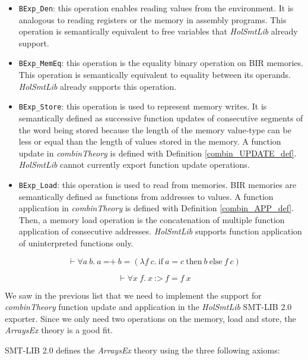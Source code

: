 \documentclass{kththesis}
\begin{document}
{\begin{itemize}
    \item \texttt{BExp\_Den}: this operation enables reading values from the environment. It is analogous to reading registers or the memory in assembly programs. This operation is semantically equivalent to free variables that \textit{HolSmtLib} already support.
    \item \texttt{BExp\_MemEq}: this operation is the equality binary operation on BIR memories. This operation is semantically equivalent to equality between its operands. \textit{HolSmtLib} already supports this operation.
    \item \texttt{BExp\_Store}: this operation is used to represent memory writes. It is semantically defined as successive function updates of consecutive segments of the word being stored because the length of the memory value-type can be less or equal than the length of values stored in the memory. A function update in \textit{combinTheory} is defined with Definition \ref{combin_UPDATE_def}. \textit{HolSmtLib} cannot currently export function update operations.
    \item \texttt{BExp\_Load}: this operation is used to read from memories. BIR memories are semantically defined as functions from addresses to values. A function application in \textit{combinTheory} is defined with Definition \ref{combin_APP_def}. Then, a memory load operation is the concatenation of multiple function application of consecutive addresses. \textit{HolSmtLib} supports function application of uninterpreted functions only.
\end{itemize}

\begin{equation}
    \vdash \forall a~b.~a~\text{=+}~b = (\lambda f~c.~\text{if}~a = c~\text{then}~b~\text{else}~f~c)
    \label{combin_UPDATE_def}
\end{equation}

\begin{equation}
    \vdash \forall x~f.~x~\text{:>}~f = f~x
    \label{combin_APP_def}
\end{equation}

We saw in the previous list that we need to implement the support for \textit{combinTheory} function update and application in the \textit{HolSmtLib} SMT-LIB 2.0 exporter. Since we only need two operations on the memory, load and store, the \textit{ArraysEx} theory is a good fit.

SMT-LIB 2.0 \cite{barrett_satisfiability_2016} defines the \textit{ArraysEx} theory using the three following axioms:

}
\end{document}
